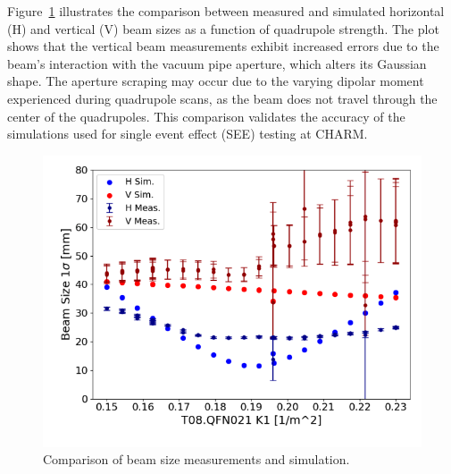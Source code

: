 \documentclass[a4paper,
               biblatex,     %
               ]{jacow}
\begin{document}


Figure~\ref{fig:diff_beam_size} illustrates the comparison between measured and simulated horizontal (H) and vertical (V) beam sizes as a function of quadrupole strength. The plot shows that the vertical beam measurements exhibit increased errors due to the beam's interaction with the vacuum pipe aperture, which alters its Gaussian shape. The aperture scraping may occur due to the varying dipolar moment experienced during quadrupole scans, as the beam does not travel through the center of the quadrupoles. This comparison validates the accuracy of the simulations used for single event effect (SEE) testing at CHARM. 

\begin{figure}[!htb]
   \centering
   \includegraphics*[width=0.9\columnwidth]{beam_size_comparison.png}
   \caption{Comparison of beam size measurements and simulation.}
   \label{fig:diff_beam_size}
\end{figure}




\end{document}
